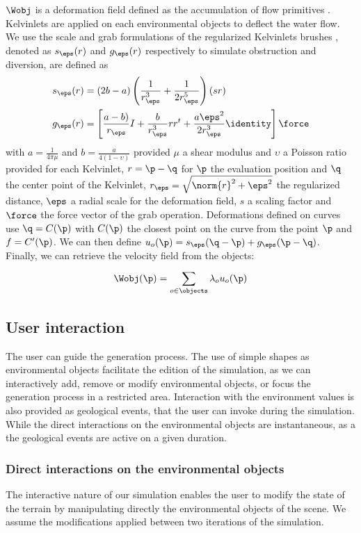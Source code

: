 $\Wobj$ is a deformation field defined as the accumulation of flow primitives \cite{Wejchert1991}. Kelvinlets are applied on each environmental objects to deflect the water flow. We use the scale and grab formulations of the regularized Kelvinlets brushes \cite{DeGoes2017}, denoted as $s_\eps(r)$ and $g_\eps(r)$ respectively to simulate obstruction and diversion, are defined as
\begin{align*}
    s_\eps(r) &= (2b - a) \left (\frac{1}{r_\eps^3} + \frac{1}{2r_\eps^5} \right)(s r) \\
    g_\eps(r) &= \left[ \frac{a - b)}{r_\eps}I + \frac{b}{r_\eps^3} r r^t + 
\frac{a \eps^2}{2 r_\eps^3} \identity \right] \force
\end{align*}
with $a = \frac{1}{4 \pi \mu}$ and $b = \frac{a}{4 (1 - \upsilon)}$ provided $\mu$ a shear modulus and $\upsilon$ a Poisson ratio provided for each Kelvinlet, $r = \p - \q$ for $\p$ the evaluation position and $\q$ the center point of the Kelvinlet, $r_\eps = \sqrt{\norm{r}^2 + \eps^2}$ the regularized distance, $\eps$ a radial scale for the deformation field, $s$ a scaling factor and $\force$ the force vector of the grab operation.
Deformations defined on curves use $\q = C(\p)$ with $C(\p)$ the closest point on the curve from the point $\p$ and $f = C'(\p)$. We can then define $u_o(\p) = s_\eps(\q - \p) + g_\eps(\p - \q)$. \\
Finally, we can retrieve the velocity field from the objects:
\begin{align*}
    \Wobj(\p) = \sum_{o \in \objects}^{}{\lambda_o u_o(\p)}
\end{align*}


\subsection{User interaction}
\label{sec:semantic-representation_interaction}
The user can guide the generation process. The use of simple shapes as environmental objects facilitate the edition of the simulation, as we can interactively add, remove or modify environmental objects, or focus the generation process in a restricted area. Interaction with the environment values is also provided as geological events, that the user can invoke during the simulation. While the direct interactions on the environmental objects are instantaneous, as a the geological events are active on a given duration.

\subsubsection{Direct interactions on the environmental objects}
\label{sec:semantic-representation_manual-interaction}
The interactive nature of our simulation enables the user to modify the state of the terrain by manipulating directly the environmental objects of the scene. We assume the modifications applied between two iterations of the simulation.


